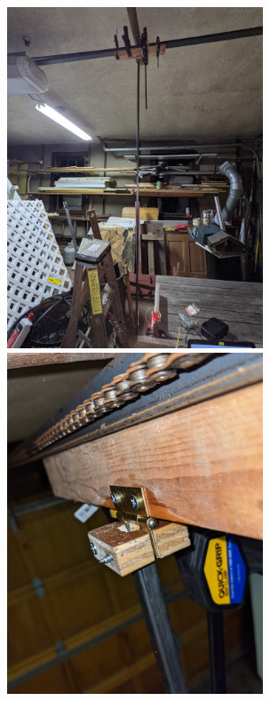 \documentclass[12pt]{article}
\begin{document}
\begin{enumerate}[label=(\alph*)]
        \includegraphics[width=3in]{whole.jpg}
        \includegraphics[width=3in]{hinge.jpg}\\


\end{enumerate}
\end{document}
